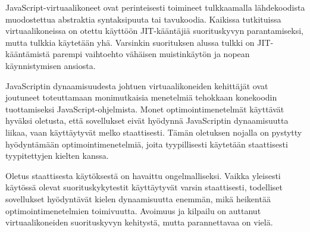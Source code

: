 JavaScript-virtuaalikoneet ovat perinteisesti toimineet tulkkaamalla lähdekoodista muodostettua abstraktia syntaksipuuta tai tavukoodia. Kaikissa tutkituissa virtuaalikoneissa on otettu käyttöön JIT-kääntäjiä suorituskyvyn parantamiseksi, mutta tulkkia käytetään yhä. Varsinkin suorituksen alussa tulkki on JIT-kääntämistä parempi vaihtoehto vähäisen muistinkäytön ja nopean käynnistymisen ansiosta.

JavaScriptin dynaamisuudesta johtuen virtuaalikoneiden kehittäjät ovat joutuneet toteuttamaan monimutkaisia menetelmiä tehokkaan konekoodin tuottamiseksi JavaScript-ohjelmista. Monet optimointimenetelmät käyttävät hyväksi oletusta, että sovellukset eivät hyödynnä JavaScriptin dynaamisuutta liikaa, vaan käyttäytyvät melko staattisesti. Tämän oletuksen nojalla on pystytty hyödyntämään optimointimenetelmiä, joita tyypillisesti käytetään staattisesti tyypitettyjen kielten kanssa.

Oletus staattisesta käytöksestä on havaittu ongelmalliseksi. Vaikka yleisesti käytössä olevat suorituskykytestit käyttäytyvät varsin staattisesti, todelliset sovellukset hyödyntävät kielen dynaamisuutta enemmän, mikä heikentää optimointimenetelmien toimivuutta. Avoimuus ja kilpailu on auttanut virtuaalikoneiden suorituskyvyn kehitystä, mutta parannettavaa on vielä.